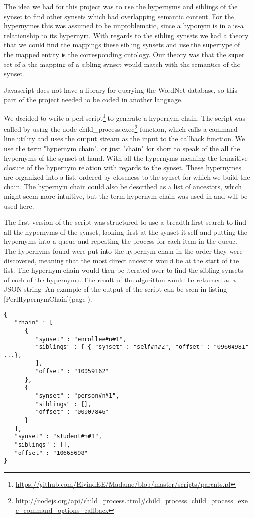 The idea we had for this project was to use the hypernyms and siblings of the synset to find other synsets
which had overlapping semantic content.
For the hypernymes this was assumed to be unproblematic, since a hyponym is in a is-a relationship to its hypernym.
With regards to the sibling synsets we had a theory that we could find the mappings these sibling synsets
and use the supertype of the mapped entity is the corresponding ontology.
Our theory was that the super set of a the mapping of a sibling synset would match with the semantics of the synset.

Javascript does not have a library for 	querying the WordNet database,
so this part of the project needed to be coded in another language.

We decided to write a perl script\footnote{\url{https://github.com/EivindEE/Madame/blob/master/scripts/parents.pl}} to generate a hypernym chain.
The script was called by using the node
child\_process.exec\footnote{\url{http://nodejs.org/api/child\_process.html\#child\_process\_child\_process\_exec\_command\_options\_callback}}
function, which calls a command line utility and uses the output stream as the input to the callback function.
We use the term "hypernym chain", or just "chain" for short to speak of the all the hypernyms of the synset at hand.
With all the hypernyms meaning  the transitive closure of the hypernym relation with regards to the synset.
These hypernymes are organized into a list, ordered by closeness to the synset for which we build the chain.
The hypernym chain could also be described as a list of ancestors,
which might seem more intuitive, but the term hypernym chain was used in \citet{Veres2011} and will be used here.

The first version of the script was structured to use a breadth first search to find all the hypernyms of the synset,
looking first at the synset it self and putting the hypernyms into a queue and repeating the process for each item in the queue.
The hypernyms found were put into the hypernym chain in the order they were discovered,
meaning that the most direct ancestor would be at the start of the list.
The hypernym chain would then be iterated over to find the sibling synsets of each of the hypernyms.
The result of the algorithm would be returned as a JSON string.
An example of the output of the script can be seen in listing \ref{PerlHypernymChain}(page \pageref{PerlHypernymChain}).

\begin{lstlisting}[label=PerlHypernymChain, caption={Excerpt from the hypernym chain for student\#n\#1}]
{
   "chain" : [
      {
         "synset" : "enrollee#n#1",
         "siblings" : [ { "synset" : "self#n#2", "offset" : "09604981" ...},
         ],
         "offset" : "10059162"
      },
      {
         "synset" : "person#n#1",
         "siblings" : [],
         "offset" : "00007846"
      }
   ],
   "synset" : "student#n#1",
   "siblings" : [],
   "offset" : "10665698"
}
\end{lstlisting}

